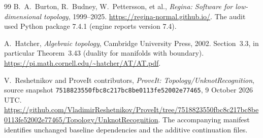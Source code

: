 \begin{thebibliography}{99}
B.~A.~Burton, R.~Budney, W.~Pettersson, et al.,
\emph{Regina: Software for low-dimensional topology}, 1999--2025.
\url{https://regina-normal.github.io/}.
The audit used Python package 7.4.1 (engine reports version 7.4).

A.~Hatcher, \emph{Algebraic topology}, Cambridge University Press, 2002.
Section~3.3, in particular Theorem~3.43 (duality for manifolds with boundary).
\url{https://pi.math.cornell.edu/~hatcher/AT/AT.pdf}.

V.~Reshetnikov and ProveIt contributors,
\emph{ProveIt: Topology/UnknotRecognition}, source snapshot
\texttt{7518823550fbc8c217bc8be0113fe52002e77465},
9 October 2026 UTC.
\url{https://github.com/VladimirReshetnikov/ProveIt/tree/7518823550fbc8c217bc8be0113fe52002e77465/Topology/UnknotRecognition}.
The accompanying manifest identifies unchanged baseline dependencies and
the additive continuation files.

\end{thebibliography}
